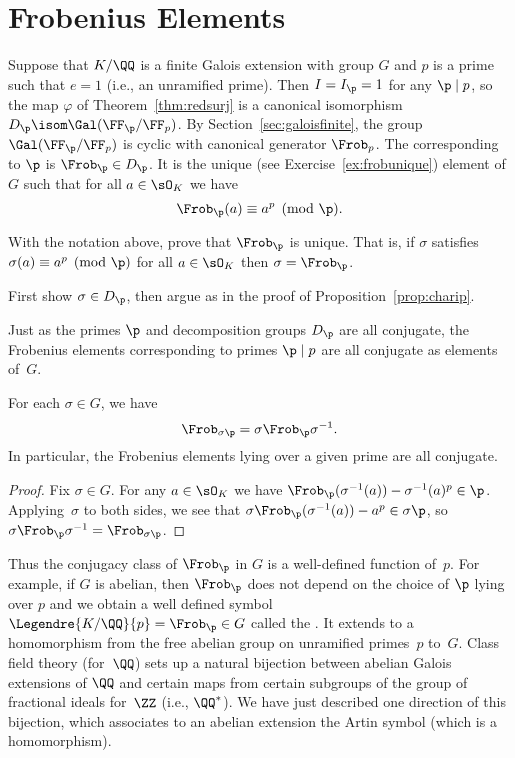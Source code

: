 \section{Frobenius Elements}

Suppose that $K/\QQ$ is a finite Galois extension with group $G$ and $p$ is a
prime such that $e = 1$ (i.e., an unramified prime). Then $I = I_\p = 1$ for
any $\p\mid p$, so the map $\varphi$ of Theorem~\ref{thm:redsurj} is a canonical
isomorphism $D_\p \isom \Gal(\FF_{\p}/\FF_p)$. By Section~\ref{sec:galoisfinite},
the group $\Gal(\FF_{\p}/\FF_p)$ is cyclic with canonical generator $\Frob_p$.
The  corresponding to $\p$ is $\Frob_\p \in D_\p$.
It is the unique (see Exercise~\ref{ex:frobunique}) element of $G$ such that
for all $a \in \sO_K$ we have
\[
  \Frob_\p(a) \equiv a^p\pmod{\p}.
\]

\begin{exercise}\label{ex:frobunique}
  With the notation above, prove that $\Frob_\p$ is unique.
  That is, if $\sigma$ satisfies $\sigma(a) \equiv a^p \pmod{\p}$
  for all $a\in\sO_K$ then $\sigma = \Frob_\p$.

  \begin{hint}
    First show $\sigma\in D_\p$, then argue as in
    the proof of Proposition~\ref{prop:charip}.
  \end{hint}
\end{exercise}


Just as the primes $\p$ and decomposition groups $D_\p$ are all
conjugate, the Frobenius elements corresponding to primes
$\p\mid p$ are all conjugate as elements of~$G$.

\begin{proposition}
  For each $\sigma \in G$, we have
  \[
    \Frob_{\sigma\p} = \sigma\Frob_\p\sigma^{-1}.
  \]
  In particular, the Frobenius elements lying over a given
  prime are all conjugate.
\end{proposition}
\begin{proof}
  Fix $\sigma\in G$. For any $a\in\sO_K$ we have
  $\Frob_\p(\sigma^{-1}(a)) - \sigma^{-1}(a)^p \in \p$.
  Applying~$\sigma$ to both sides, we see that
  $\sigma\Frob_\p(\sigma^{-1}(a)) - a^p \in \sigma\p$,
  so $\sigma\Frob_\p\sigma^{-1} = \Frob_{\sigma \p}$.
\end{proof}

Thus the conjugacy class of $\Frob_\p$ in $G$ is a well-defined
function of~$p$.  For example, if $G$ is abelian, then $\Frob_\p$ does
not depend on the choice of $\p$ lying over $p$ and we obtain a well
defined symbol $\Legendre{K/\QQ}{p} = \Frob_\p\in G$ called the .
It extends to a homomorphism from the free abelian
group on unramified primes~$p$ to~$G$.
Class field theory (for~$\QQ$) sets up a natural bijection
between abelian Galois extensions of $\QQ$ and certain maps from
certain subgroups of the group of fractional ideals for~$\ZZ$ (i.e., $\QQ^*$).
We have just described one direction of this bijection, which associates to an
abelian extension the Artin symbol (which is a homomorphism).

